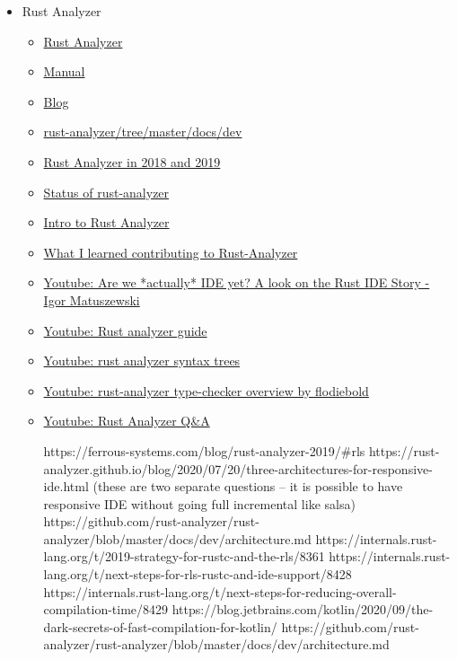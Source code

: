 \documentclass[12pt, a4paper]{report}
\begin{document}
\begin{itemize}[noitemsep]
  \item Rust Analyzer
    \begin{itemize}[noitemsep]
    \item \href{https://rust-analyzer.github.io/}{\Square Rust Analyzer}
    \item \href{https://rust-analyzer.github.io/manual.html}{\Square Manual}
    \item \href{https://rust-analyzer.github.io/blog}{\Square Blog}
    \item \href{https://github.com/rust-analyzer/rust-analyzer/tree/master/docs/dev}{\Square rust-analyzer/tree/master/docs/dev}
    \item \href{https://ferrous-systems.com/blog/rust-analyzer-2019/}{\Square Rust Analyzer in 2018 and 2019}
    \item \href{https://ferrous-systems.com/blog/rust-analyzer-status-opencollective/}{\Square Status of rust-analyzer}
    \item \href{https://blog.logrocket.com/intro-to-rust-analyzer/}{ Intro to Rust Analyzer}
    \item \href{https://dev.to/bnjjj/what-i-learned-contributing-to-rust-analyzer-4c7e}{ What I learned contributing to Rust-Analyzer}
    \item \href{https://www.youtube.com/watch?v=7_7ckOKZCJE}{\Square Youtube: Are we *actually* IDE yet? A look on the Rust IDE Story - Igor Matuszewski}
    \item \href{https://www.youtube.com/watch?v=ANKBNiSWyfc}{\Square Youtube: Rust analyzer guide}
    \item \href{https://www.youtube.com/watch?v=DGAuLWdCCAI}{\CheckedBox Youtube: rust analyzer syntax trees}
    \item \href{https://www.youtube.com/watch?v=Lmp3P9WNL8o}{\CheckedBox Youtube: rust-analyzer type-checker overview by flodiebold}
    \item \href{https://www.youtube.com/playlist?list=PLXajQV_H-DxLMBt0amcuxgTeOTj6L-YGl}{\Square Youtube: Rust Analyzer Q\&A}

    https://ferrous-systems.com/blog/rust-analyzer-2019/#rls
    https://rust-analyzer.github.io/blog/2020/07/20/three-architectures-for-responsive-ide.html
    (these are two separate questions -- it is possible to have responsive IDE without going full incremental like salsa)
    https://github.com/rust-analyzer/rust-analyzer/blob/master/docs/dev/architecture.md
    https://internals.rust-lang.org/t/2019-strategy-for-rustc-and-the-rls/8361
    https://internals.rust-lang.org/t/next-steps-for-rls-rustc-and-ide-support/8428
    https://internals.rust-lang.org/t/next-steps-for-reducing-overall-compilation-time/8429
    https://blog.jetbrains.com/kotlin/2020/09/the-dark-secrets-of-fast-compilation-for-kotlin/
    https://github.com/rust-analyzer/rust-analyzer/blob/master/docs/dev/architecture.md
    \end{itemize}


\end{itemize}
\end{document}
